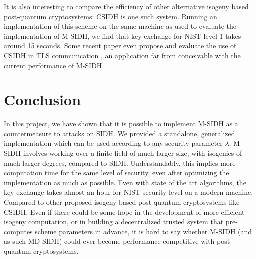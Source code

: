 \documentclass[a4paper,11pt,oneside]{report}
\begin{document}
\label{alt_csidh}
It is also interesting to compare the efficiency of other alternative isogeny based post-quantum cryptosystems: CSIDH \cite{csidh} is one such system. Running an implementation of this scheme \cite{sibc} on the same machine as used to evaluate the implementation of M-SIDH, we find that key exchange for NIST level 1 takes around 15 seconds. Some recent paper even propose and evaluate the use of CSIDH in TLS communication \cite{csidh-tls}, an application far from conceivable with the current performance of M-SIDH.




\chapter{Conclusion}

In this project, we have shown that it is possible to implement M-SIDH as a countermeasure to attacks on SIDH. We provided a standalone, generalized implementation which can be used according to any security parameter $\lambda$. M-SIDH involves working over a finite field of much larger size, with isogenies of much larger degrees, compared to SIDH. Understandably, this implies more computation time for the same level of security, even after optimizing the implementation as much as possible. Even with state of the art algorithms, the key exchange takes almost an hour for NIST security level on a modern machine. Compared to other proposed isogeny based post-quantum cryptosystems like CSIDH. Even if there could be some hope in the development of more efficient isogeny computation, or in building a decentralized trusted system that pre-computes scheme parameters in advance, it is hard to say whether M-SIDH (and as such MD-SIDH) could ever become performance competitive with post-quantum cryptosystems.



\cleardoublepage
{}
{}
\printbibliography

%
%
\end{document}
